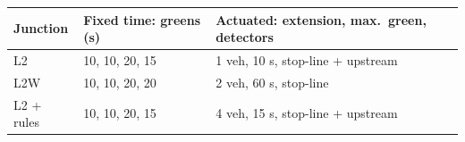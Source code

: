 \begin{tabular}{lll}
\toprule
Junction & Fixed time: greens (s) & Actuated: extension, max.\ green, detectors \\
\midrule
L2 & 10, 10, 20, 15 & 1 veh, 10 s, stop-line + upstream \\
L2W & 10, 10, 20, 20 & 2 veh, 60 s, stop-line \\
L2 + rules & 10, 10, 20, 15 & 4 veh, 15 s, stop-line + upstream \\
\bottomrule
\end{tabular}
